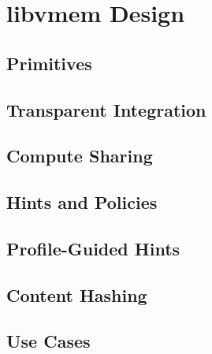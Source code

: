 \section{libvmem Design}
\label{sec:design}

\subsection{Primitives}

\subsection{Transparent Integration}

\subsection{Compute Sharing}

\subsection{Hints and Policies}

\subsection{Profile-Guided Hints}

\subsection{Content Hashing}

\subsection{Use Cases}
